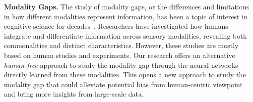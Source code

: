 \textbf{Modality Gaps.}
The study of modality gaps, or the differences and limitations in how different modalities represent information, has been a topic of interest in cognitive science for decades~\citep{spence2011crossmodal, paivio1991dual, calvert2004handbook}. Researchers have investigated how humans integrate and differentiate information across sensory modalities, revealing both commonalities and distinct characteristics. However, these studies are mostly based on human studies and experiments. Our research offers an alternative \emph{human-free} approach to study the modality gap through the neural networks directly learned from these modalities. This opens a new approach to study the modality gap that could alleviate potential bias from human-centric viewpoint and bring more insights from large-scale data. 

